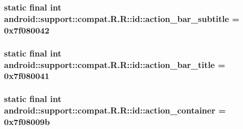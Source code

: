 \hypertarget{classandroid_1_1support_1_1compat_1_1_r_1_1id_376f9bac1e7a0044df8fcd33c020ed66}{
\subsubsection[{action\_\-bar\_\-subtitle}]{\setlength{\rightskip}{0pt plus 5cm}static final int android::support::compat.R.R::id::action\_\-bar\_\-subtitle = 0x7f080042}}
\label{classandroid_1_1support_1_1compat_1_1_r_1_1id_376f9bac1e7a0044df8fcd33c020ed66}


\hypertarget{classandroid_1_1support_1_1compat_1_1_r_1_1id_3596f4c73ae85552846bb8319bc9461f}{
\subsubsection[{action\_\-bar\_\-title}]{\setlength{\rightskip}{0pt plus 5cm}static final int android::support::compat.R.R::id::action\_\-bar\_\-title = 0x7f080041}}
\label{classandroid_1_1support_1_1compat_1_1_r_1_1id_3596f4c73ae85552846bb8319bc9461f}


\hypertarget{classandroid_1_1support_1_1compat_1_1_r_1_1id_f8714b54be33c2705322735872970913}{
\subsubsection[{action\_\-container}]{\setlength{\rightskip}{0pt plus 5cm}static final int android::support::compat.R.R::id::action\_\-container = 0x7f08009b}}
\label{classandroid_1_1support_1_1compat_1_1_r_1_1id_f8714b54be33c2705322735872970913}


